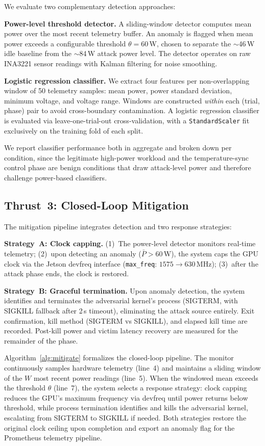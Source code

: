 \documentclass[conference]{IEEEtran}
\begin{document}
We evaluate two complementary detection approaches:

\textbf{Power-level threshold detector.}
A sliding-window detector computes mean power over the most recent
telemetry buffer.  An anomaly is flagged when mean power exceeds a
configurable threshold $\theta = 60$\,W, chosen to separate the
$\sim$46\,W idle baseline from the $\sim$84\,W attack power level.
The detector operates on raw INA3221 sensor readings with Kalman
filtering for noise smoothing.

\textbf{Logistic regression classifier.}
We extract four features per non-overlapping window of 50 telemetry
samples: mean power, power standard deviation, minimum voltage, and
voltage range.  Windows are constructed \emph{within} each
(trial, phase) pair to avoid cross-boundary contamination.  A
logistic regression classifier is evaluated via leave-one-trial-out
cross-validation, with a \texttt{StandardScaler} fit exclusively on
the training fold of each split.

We report classifier performance both in aggregate and broken down
per condition, since the legitimate high-power workload and the
temperature-sync control phase are benign conditions that draw
attack-level power and therefore challenge power-based classifiers.

\subsection{Thrust~3: Closed-Loop Mitigation}

The mitigation pipeline integrates detection and two response
strategies:

\textbf{Strategy~A: Clock capping.}
(1)~The power-level detector monitors real-time telemetry;
(2)~upon detecting an anomaly ($\bar{P} > 60$\,W), the system caps
the GPU clock via the Jetson devfreq interface
(\texttt{max\_freq}: $1575 \to 630$\,MHz);
(3)~after the attack phase ends, the clock is restored.

\textbf{Strategy~B: Graceful termination.}
Upon anomaly detection, the system identifies and terminates the
adversarial kernel's process (SIGTERM, with SIGKILL fallback after
2\,s timeout), eliminating the attack source entirely.  Exit
confirmation, kill method (SIGTERM vs SIGKILL), and elapsed kill
time are recorded.  Post-kill power and victim latency recovery
are measured for the remainder of the phase.

Algorithm~\ref{alg:mitigate} formalizes the closed-loop pipeline.
The monitor continuously samples hardware telemetry (line~4) and
maintains a sliding window of the $W$ most recent power readings
(line~5).  When the windowed mean exceeds the threshold $\theta$
(line~7), the system selects a response strategy: clock capping
reduces the GPU's maximum frequency via devfreq until power returns
below threshold, while process termination identifies and kills the
adversarial kernel, escalating from SIGTERM to SIGKILL if needed.
Both strategies restore the original clock ceiling upon completion
and export an anomaly flag for the Prometheus telemetry pipeline.
\end{document}
